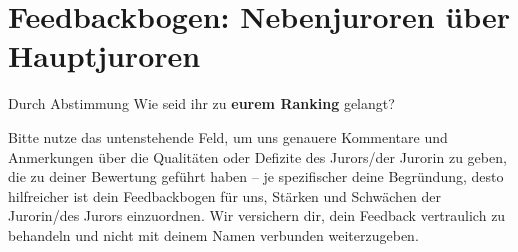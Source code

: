 \fancyhf{}

\section*{Feedbackbogen: Nebenjuroren über Hauptjuroren}


\bigskip

{Durch Abstimmung}{
  Wie seid ihr zu \textbf{eurem Ranking} gelangt?
}
\medskip

\medskip

\medskip

\medskip

\medskip

\hrulefill

Bitte nutze das untenstehende Feld, um uns genauere Kommentare und Anmerkungen
über die Qualitäten oder Defizite des Jurors/der Jurorin zu geben, die zu
deiner Bewertung geführt haben -- je spezifischer deine Begründung, desto
hilfreicher ist dein Feedbackbogen für uns, Stärken und Schwächen der
Jurorin/des Jurors einzuordnen. Wir versichern dir, dein Feedback vertraulich zu
behandeln und nicht mit deinem Namen verbunden weiterzugeben.

\medskip

\strengthsandweaknesses{9cm}

\newpage
